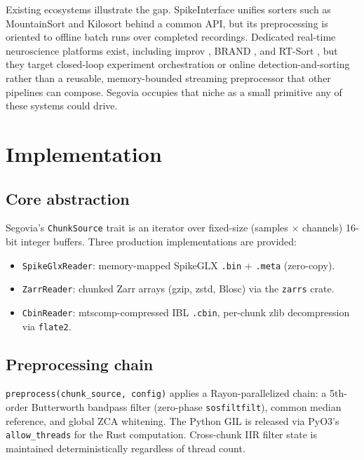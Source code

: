 \documentclass[a4paper,num-refs,gigabyte]{oup-contemporary}
\begin{document}
Existing ecosystems illustrate the gap. SpikeInterface \citep{Buccino2020} unifies sorters such as MountainSort \citep{Chung2017} and Kilosort \citep{Pachitariu2024} behind a common API, but its preprocessing is oriented to offline batch runs over completed recordings. Dedicated real-time neuroscience platforms exist, including improv \citep{Draelos2025}, BRAND \citep{Ali2024}, and RT-Sort \citep{vanderMolen2024}, but they target closed-loop experiment orchestration or online detection-and-sorting rather than a reusable, memory-bounded streaming preprocessor that other pipelines can compose. Segovia occupies that niche as a small primitive any of these systems could drive.

\section{Implementation}

\subsection{Core abstraction}

Segovia's \texttt{ChunkSource} trait is an iterator over fixed-size (samples $\times$ channels) 16-bit integer buffers. Three production implementations are provided:

\begin{itemize}
\item \texttt{SpikeGlxReader}: memory-mapped SpikeGLX \texttt{.bin} + \texttt{.meta} (zero-copy).
\item \texttt{ZarrReader}: chunked Zarr arrays (gzip, zstd, Blosc) via the \texttt{zarrs} crate.
\item \texttt{CbinReader}: mtscomp-compressed IBL \texttt{.cbin}, per-chunk zlib decompression via \texttt{flate2}.
\end{itemize}

\subsection{Preprocessing chain}

\texttt{preprocess(chunk\_source, config)} applies a Rayon-parallelized chain: a 5th-order Butterworth bandpass filter (zero-phase \texttt{sosfiltfilt}), common median reference, and global ZCA whitening. The Python GIL is released via PyO3's \texttt{allow\_threads} for the Rust computation. Cross-chunk IIR filter state is maintained deterministically regardless of thread count.
\end{document}
